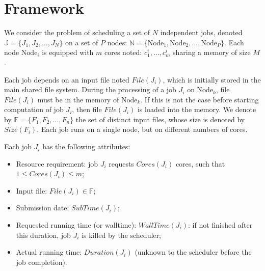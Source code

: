 \documentclass[conference,10pt]{IEEEtran}
\newcommand{\Node}[1]{\ensuremath{\mathrm{Node}_{#1}}\xspace}
\newcommand{\file}{\ensuremath{\mathit{File}}\xspace}
\newcommand{\size}{\ensuremath{\mathit{Size}}\xspace}
\newcommand{\memory}{\ensuremath{\mathit{M}}\xspace}
\newcommand{\duration}{\mathit{Duration}\xspace}
\newcommand{\core}{\mathit{Cores}\xspace}
\newcommand{\submissiontime}{\mathit{SubTime}\xspace}
\newcommand{\walltime}{\mathit{WallTime}\xspace}
\newcommand{\fileset}{\ensuremath{\mathbb{F}}\xspace}
\newcommand{\jobset}{\ensuremath{\mathbb{J}}\xspace}
\newcommand{\nodeset}{\ensuremath{\mathbb{N}}\xspace}
\begin{document}

\section{Framework}\label{sec.framework}

We consider the problem of scheduling a set of $N$ independent jobs,
denoted $\jobset = \{J_1, J_2, \ldots, J_N\}$ on a set of $P$ nodes:
$\nodeset = \{\Node{1}, \Node{2}, \ldots, \Node{P}\}$.
Each node $\Node{i}$ is equipped with $m$ cores noted:
$c^i_1,\ldots,c^i_m$ sharing a memory of size $\memory$.

Each job depends on an input file noted $\file(J_i)$, which is
initially stored in the main shared file system.  During the
processing of a job $J_i$ on $\Node{k}$, file $\file(J_i)$ must be in
the memory of $\Node{k}$. If this is not the case before starting
computation of job $J_i$, then file $\file(J_i)$ is loaded into the
memory.  We denote by $\fileset = \{F_1, F_2, \ldots, F_n\}$ the set
of distinct input files, whose size is denoted by $\size(F_i)$. Each
job runs on a single node, but on different numbers of cores.



Each job $J_i$ has the following attributes:
\begin{itemize}
\item Resource requirement: job $J_i$ requests $\core(J_i)$  cores, such that $1 \leq \core(J_i) \leq m$;
\item Input file: $\file(J_i) \in \fileset$;
\item Submission date: $\submissiontime(J_i)$;
\item Requested running time (or walltime): $\walltime(J_i)$: if not
  finished after this duration, job $J_i$ is killed by the scheduler;
\item Actual running time: $\duration(J_i)$ (unknown to  the scheduler
  before the job completion).
\end{itemize}
\end{document}
